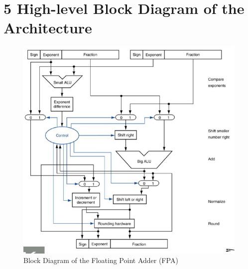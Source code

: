 \documentclass{article}
\begin{document}





\pagebreak

\section*{5 High-level Block Diagram of the Architecture}
\begin{figure}[h!]
\centering
\includegraphics[width=\textwidth]{Block.jpg} 
\caption{Block Diagram of the Floating Point Adder (FPA)}
\label{fig:fpa_block_diagram}
\end{figure}
\pagebreak
\end{document}
